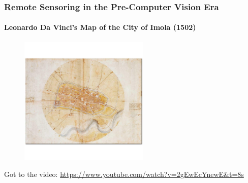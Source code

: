 \documentclass[show notes, aspectratio=1610]{beamer}
\begin{document}
\begin{frame}
	\frametitle{Remote Sensoring in the Pre-Computer Vision Era}
	\framesubtitle{Leonardo Da Vinci's Map of the City of Imola (1502)}
	\begin{figure}
		\includegraphics[width=0.55\textwidth]{images/imola_map.jpg}
	\end{figure}

	\vspace{-3em}

	Got to the video: \url{https://www.youtube.com/watch?v=2gEwEcYnewE&t=8s}
\end{frame}
\end{document}

